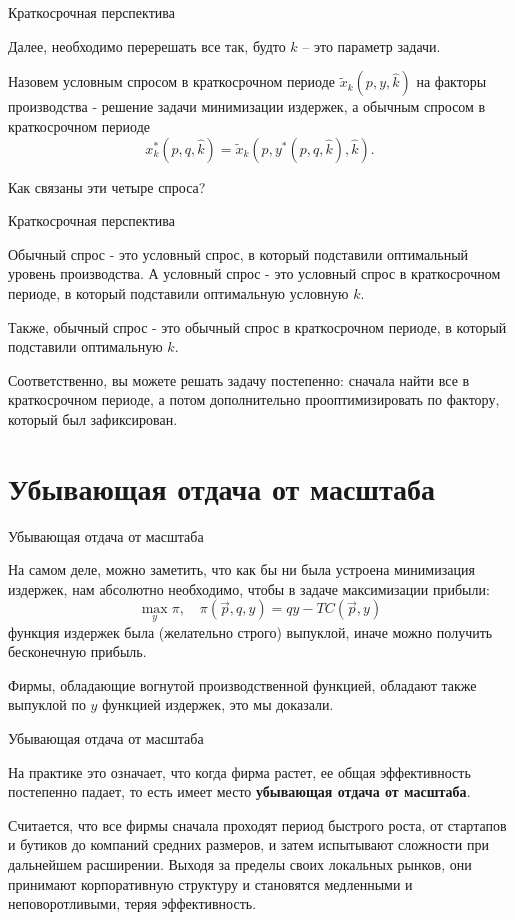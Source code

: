 \documentclass{beamer}
\begin{document}
\begin{frame}{Краткосрочная перспектива}

Далее, необходимо перерешать все так, будто $\hat k$ – это параметр задачи.

\begin{definition}
Назовем условным спросом в краткосрочном периоде $\tilde x_{k}(p, y, \hat k)$ на факторы производства - решение задачи минимизации издержек, а обычным спросом в краткосрочном периоде
$$x_k^{\ast}(p, q, \hat k) = \tilde x_k(p, y^{\ast}(p, q, \hat k), \hat k).$$
\end{definition}
Как связаны эти четыре спроса?

\end{frame}

\begin{frame}{Краткосрочная перспектива}

Обычный спрос - это условный спрос, в который подставили оптимальный уровень производства. А условный спрос - это условный спрос в краткосрочном периоде, в который подставили оптимальную условную $k$.

Также, обычный спрос - это обычный спрос в краткосрочном периоде, в который подставили оптимальную $k$.

Соответственно, вы можете решать задачу постепенно: сначала найти все в краткосрочном периоде, а потом дополнительно прооптимизировать по фактору, который был зафиксирован.

\end{frame}

\section{Убывающая отдача от масштаба}

\begin{frame}{Убывающая отдача от масштаба}

На самом деле, можно заметить, что как бы ни была устроена минимизация издержек, нам абсолютно необходимо, чтобы в задаче максимизации прибыли:
$$ \max_{y} \pi, \quad \pi(\vec p, q, y) = q y - TC(\vec p, y)$$
функция издержек была (желательно строго) выпуклой, иначе можно получить бесконечную прибыль.

Фирмы, обладающие вогнутой производственной функцией, обладают также выпуклой по $y$ функцией издержек, это мы доказали.

\end{frame}

\begin{frame}{Убывающая отдача от масштаба}

На практике это означает, что когда фирма растет, ее общая эффективность постепенно падает, то есть имеет место \textbf{убывающая отдача от масштаба}.

Считается, что все фирмы сначала проходят период быстрого роста, от стартапов и бутиков до компаний средних размеров, и затем испытывают сложности при дальнейшем расширении. Выходя за пределы своих локальных рынков, они принимают корпоративную структуру и становятся медленными и неповоротливыми, теряя эффективность.

\end{frame}
\end{document}
